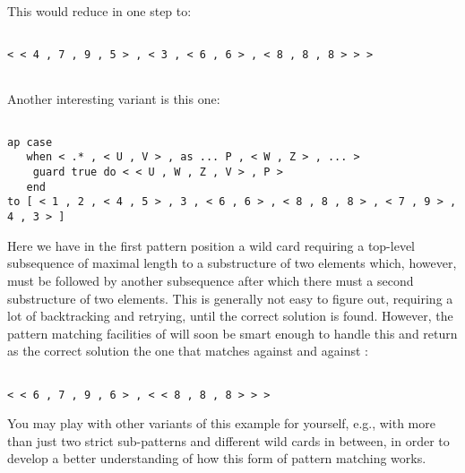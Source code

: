 This would reduce in one step to:
\begin{verbatim}

< < 4 , 7 , 9 , 5 > , < 3 , < 6 , 6 > , < 8 , 8 , 8 > > >
 
\end{verbatim}
Another interesting variant is this one:
\begin{verbatim}

ap case 
   when < .* , < U , V > , as ... P , < W , Z > , ... >
    guard true do < < U , W , Z , V > , P >
   end
to [ < 1 , 2 , < 4 , 5 > , 3 , < 6 , 6 > , < 8 , 8 , 8 > , < 7 , 9 > , 4 , 3 > ]

\end{verbatim}
Here we have in the first pattern position a wild card requiring a top-level 
subsequence of maximal length to a substructure of two elements which, however,
must be followed by another subsequence after which there must a second
substructure of two elements. This is generally not easy to figure out, requiring
a lot of backtracking and retrying, until the correct solution is found.
However, the pattern matching facilities of \pired  will soon be
 smart enough to handle this and return
as the correct solution the one that matches {\tt <U,V>} against {\tt <6,6>}
and {\tt <W,Z>} against {\tt <7,9>}:
\begin{verbatim}

< < 6 , 7 , 9 , 6 > , < < 8 , 8 , 8 > > >

\end{verbatim}
You may play with  other variants of this example for yourself, e.g., with more
than just two strict sub-patterns and different wild cards in between, in order to
develop a better understanding of how this form of pattern matching works.

